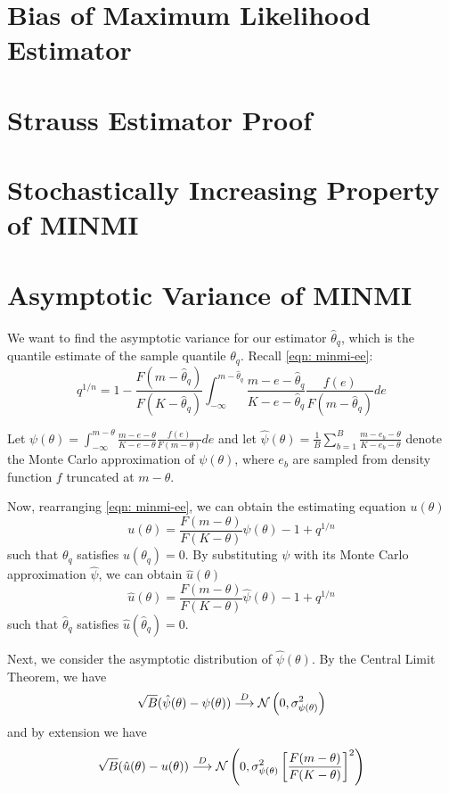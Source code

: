 \section{Bias of Maximum Likelihood Estimator}

\section{Strauss Estimator Proof}

\section{Stochastically Increasing Property of MINMI}
\clearpage

\section{Asymptotic Variance of MINMI}\label{apx: minmi-asymptotics}

We want to find the asymptotic variance for our estimator $\hat\theta_q$, which is the quantile estimate of the sample quantile $\theta_q$. Recall \autoref{eqn: minmi-ee}: \[ q^{1/n} = 1 - \frac{F(m-\hat\theta_q)}{F(K-\hat\theta_q)} \int^{m-\hat\theta_q}_{-\infty} \frac{m-e-\hat\theta_q}{K-e-\hat\theta_q} \frac{f(e)}{F(m-\hat\theta_q)} de \]

Let $\psi(\theta) = \int^{m-\theta}_{-\infty} \frac{m-e-\theta}{K-e-\theta} \frac{f(e)}{F(m-\theta)} de$ and let $\hat\psi(\theta) = \frac{1}{B} \sum_{b=1}^B \frac{m-e_b-\theta}{K-e_b-\theta}$ denote the Monte Carlo approximation of $\psi(\theta)$, where $e_b$ are sampled from density function $f$ truncated at $m-\theta$.

Now, rearranging \autoref{eqn: minmi-ee}, we can obtain the estimating equation $u(\theta)$ \begin{equation}
    u(\theta) = \frac{F(m-\theta)}{F(K-\theta)} \psi(\theta) - 1 + q^{1/n}
\end{equation} such that $\theta_q$ satisfies $u(\theta_q) = 0$. By substituting $\psi$ with its Monte Carlo approximation $\hat\psi$, we can obtain $\hat{u}(\theta)$ \begin{equation}
    \hat{u}(\theta) = \frac{F(m-\theta)}{F(K-\theta)} \hat{\psi}(\theta) - 1 + q^{1/n}
\end{equation} such that $\hat\theta_q$ satisfies $\hat{u}(\hat\theta_q) = 0$.

Next, we consider the asymptotic distribution of $\hat\psi(\theta)$. By the Central Limit Theorem, we have \begin{equation} \label{eqn: psi_hat_CLT}
    \sqrt{B} (\hat\psi(\theta) - \psi(\theta)) \overset{D}{\longrightarrow} \mathcal{N}\left(0, \sigma^2_{\psi(\theta)} \right)
\end{equation} and by extension we have \begin{equation}
    \sqrt{B} (\hat{u}(\theta) - u(\theta)) \overset{D}{\longrightarrow} \mathcal{N}\left(0, \sigma^2_{\psi(\theta)} \left[ \frac{F(m-\theta)}{F(K-\theta)} \right]^2 \right)
\end{equation}


